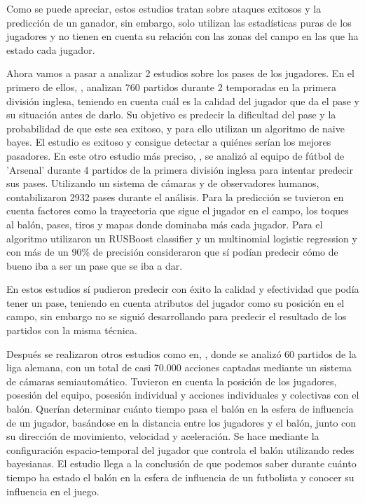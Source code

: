 Como se puede apreciar, estos estudios tratan sobre ataques exitosos y la predicción de un ganador, sin embargo, solo utilizan las estadísticas puras de los jugadores y no tienen en cuenta su relación con las zonas del campo en las que ha estado cada jugador.

Ahora vamos a pasar a analizar 2 estudios sobre los pases de los jugadores. En el primero de ellos, \cite{first-passes}, analizan 760 partidos durante 2 temporadas en la primera división inglesa, teniendo en cuenta cuál es la calidad del jugador que da el pase y su situación antes de darlo. Su objetivo es predecir la dificultad del pase y la probabilidad de que este sea exitoso, y para ello utilizan un algoritmo de naive bayes. El estudio es exitoso y consigue detectar a quiénes serían los mejores pasadores. En este otro estudio más preciso, \cite{second-passes}, se analizó al equipo de fútbol de 'Arsenal' durante 4 partidos de la primera división inglesa para intentar predecir sus pases. Utilizando un sistema de cámaras y de observadores humanos, contabilizaron 2932 pases durante el análisis. Para la predicción se tuvieron en cuenta factores como la trayectoria que sigue el jugador en el campo, los toques al balón, pases, tiros y mapas donde dominaba más cada jugador. Para el algoritmo utilizaron un RUSBoost classifier y un multinomial logistic regression y con más de un 90\% de precisión consideraron que sí podían predecir cómo de bueno iba a ser un pase que se iba a dar.

En estos estudios sí pudieron predecir con éxito la calidad y efectividad que podía tener un pase, teniendo en cuenta atributos del jugador como su posición en el campo, sin embargo no se siguió desarrollando para predecir el resultado de los partidos con la misma técnica.

Después se realizaron otros estudios como en, \cite{first-other}, donde se analizó 60 partidos de la liga alemana, con un total de casi 70.000 acciones captadas mediante un sistema de cámaras semiautomático. Tuvieron en cuenta la posición de los jugadores, posesión del equipo, posesión individual y acciones individuales y colectivas con el balón. Querían determinar cuánto tiempo pasa el balón en la esfera de influencia de un jugador, basándose en la distancia entre los jugadores y el balón, junto con su dirección de movimiento, velocidad y aceleración. Se hace mediante la configuración espacio-temporal del jugador que controla el balón utilizando redes bayesianas. El estudio llega a la conclusión de que podemos saber durante cuánto tiempo ha estado el balón en la esfera de influencia de un futbolista y conocer su influencia en el juego.

